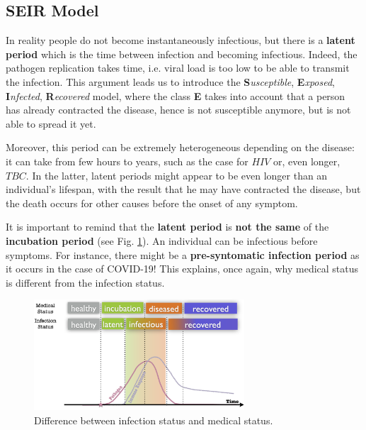 \documentclass[../main/main.tex]{subfiles}
\begin{document}
\subsection{SEIR Model}

In reality people do not become instantaneously infectious, but there is a \textbf{latent period} which is the time between infection and becoming infectious. Indeed, the pathogen replication takes time, i.e. viral load is too low to be able to transmit the infection. This argument leads us to introduce the \textbf{S}\textit{usceptible},  \textbf{E}\textit{xposed}, \textbf{I}\textit{nfected}, \textbf{R}\textit{ecovered} model, where the class \textbf{E} takes into account that a person has already contracted the disease, hence is not susceptible anymore, but is not able to spread it yet.

Moreover, this period can be extremely heterogeneous depending on the disease: it can take from few hours to years, such as the case for $HIV$ or, even longer, $TBC$. In the latter, latent periods might appear to be even longer than an individual's lifespan, with the result that he may have contracted the disease, but the death occurs for other causes before the onset of any symptom.

It is important to remind that the \textbf{latent period} is \textbf{not the same} of the \textbf{incubation period} (see Fig. \ref{fig:05_1}). An individual can be infectious before symptoms. For instance, there might be a \textbf{pre-syntomatic infection period} as it occurs in the case of COVID-19! This explains, once again, why medical status is different from the infection status.

\begin{figure}[h!]
\centering
\includegraphics[width=0.7\textwidth]{../lessons/image/05/1.png}
\caption{\label{fig:05_1} Difference between infection status and medical status.}
\end{figure}
\end{document}
